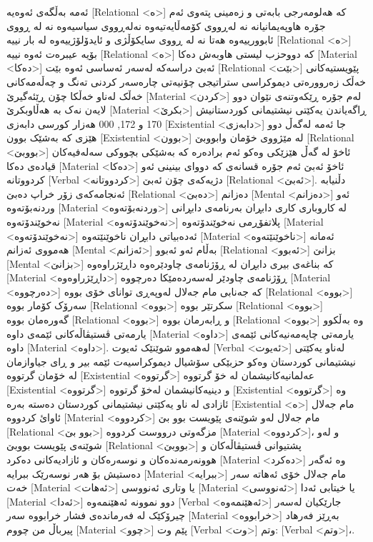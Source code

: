 ئەمە بەڵگەی ئەوەیە [Relational <ە>] کە هەلومەرجی بابەتی و زەمینی پتەوی ئەم جۆرە هاوپەیمانیانە نە لەڕووی کۆمەڵایەتیەوە نەلەڕووی سیاسیەوە نە لە ڕووی ئابوورییەوە هەتا نە لە ڕووی سایکۆڵژی و ئایدۆلۆژییەوە لە بار نییە [Relational <ە>] بۆیە عیبرەت ئەوە نییە [Relational <ە>] کە دووحزب لیستی هاوبەش دەکا [Material <دەکا>] ئەبێ دراسەکە لەسەر ئەساسی ئەوە بێت [Relational <بێت>] پێویستیەکانی خەڵک زەروورەتی دیموکراسی ستراتیجی چۆنیەتی چارەسەر کردنی تەنگ و چەڵەمەکانی خەڵک لەناو خەڵکا چۆن ڕێئەگیرێ [Material <کردن>] لەم جۆرە ڕێکەوتنەی نێوان دوو لایەن نەک بە هەڵاوبکرێ [Material <بکرێ>] ڕاگەیاندن یەکێتی نیشتیمانی کوردستانیش 170 و 172, 000 هەزار کورسی دابەزی [Existential <دابەزی>] جا ئەمە لەگەڵ دوو هێزی کە بەشێک بوون [Existential <بوون>] لە مێژووی خۆمان وابووبێ [Relational <بووبێ>] ئاخۆ لە گەڵ هێزێکی وەکو ئەم برادەرە کە بەشێکی بچووکی سەلەفیەکان قیادەی دەکا [Material <دەکا>] ئاخۆ ئەبێ ئەم جۆرە قسانەی کە دووای بینینی ئەو کردووتانە [Verbal <کردووتانە>] دژیەکەی چۆن ئەبێ [Relational <ئەبێ>].
دڵنیابە ئەنجامەکەی زۆر خراپ دەبێ [Relational <دەبێ>] دەزانم [Mental <دەزانم>] ئەو وردنەبۆتەوە [Material <وردنەبۆتەوە>] لە کاروباری کاری دابڕان بەرنامەی دابڕانی نەخوێندۆتەوە [Material <نەخوێندۆتەوە>] پلاتفۆڕمی نەخوێندۆتەوە [Material <نەخوێندۆتەوە>] ئەدەبیاتی دابڕان ناخوێنێتەوە [Material <ناخوێنێتەوە>] ئەمانە هەمووی ئەزانم [Mental <ئەزانم>] بەڵام ئەو ئەبوو [Relational <ئەبوو>] بزانێ [Mental <بزانێ>] کە بناغەی بیری دابڕان له ڕۆژنامەی چاودێرەوە داڕێژراوەوە [Material <داڕێژراوەوە>] ڕۆژنامەی چاودێر لەسەردەمێکا دەرچووە [Material <دەرچووە>] کە جەنابی مام جەلال لەوپەڕی توانای خۆی بووە [Relational <بووە>] سەرۆک کۆمار بووە [Relational <بووە>] سکرتێر بووە [Relational <بووە>] گەورەمان بووە [Relational <بووە>] و ڕابەرمان بووە [Relational <بووە>] وە بەڵکوو یارمەتی ڤستیڤاڵەکانی ئێمەی داوە [Material <داوە>] یارمەتی چاپەمەنیەکانی ئێمەی داوە [Material <داوە>].
لەهەموو شوێنێک ئەیوت [Verbal <ئەیوت>] لەناو یەکێتی نیشتیمانی کوردستان وەکو حزبێکی سۆشیال دیموکراسیەت ئێمە بیر و ڕای جیاوازمان لە خۆمان گرتووە [Existential <گرتووە>] عەلمانیەکانیشمان لە خۆ گرتووە [Existential <گرتووە>] و دینیەکانیشمان لەخۆ گرتووە [Existential <گرتووە>] وە ئازادی لە ناو یەکێتی نیشتیمانی کوردستان دەستە بەرە [Existential <ە>] مام جەلال ئاوائ کردووە [Material <کردووە>] مام جەلال لەو شوێنەی پێویست بوو بێ [Relational <بوو بێ>] مزگەوتی درووست کردووە [Material <کردووە>]، و لەو شوێنەی پێویست بووبێ [Relational <بووبێ>] پشتیوانی ڤستیڤاڵەکان و هوونەرمەندەکان و نوسەرەکان و ئازادیەکانی دەکرد [Material <دەکرد>] وە ئەگەر دەستیش بۆ هەر نوسەرێک ببرایە [Material <ببرایە>] مام جەلال خۆی ئەهاتە سەر خەت [Material <ئەهات>] یا وتاری ئەنووسی [Material <ئەنووسی>] یا خیتابی ئەدا [Material <ئەدا>] دوو نموونە ئەهێنمەوە [Verbal <ئەهێنمەوە>] جارێکیان لەسەر چیرۆکێک لە فەرماندەی فشار خرابووە سەر [Material <خرابووە>] بەڕێز فەرهاد پیرباڵ من چووم [Material <چوو>] پێم وت [Verbal <وت>] وتم: [Verbal <وتم>]،.
